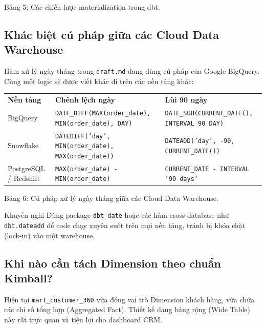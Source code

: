 \documentclass[12pt]{article}
\begin{document}
\begin{captionbelowboxaivn}
Bảng 5: Các chiến lược materialization trong dbt.
\end{captionbelowboxaivn}

\subsection{Khác biệt cú pháp giữa các Cloud Data Warehouse}

Hàm xử lý ngày tháng trong \texttt{draft.md} đang dùng cú pháp của Google BigQuery. Cùng một logic sẽ được viết khác đi trên các nền tảng khác:

\noindent
\begin{longtable}{@{}>{\RaggedRight\arraybackslash}p{2.8cm}>{\RaggedRight\arraybackslash}p{6.3cm}>{\RaggedRight\arraybackslash}p{6.7cm}@{}}
\rowcolor{rowLavender}
\textbf{Nền tảng} & \textbf{Chênh lệch ngày} & \textbf{Lùi 90 ngày} \\
\addlinespace[3pt]
\endhead
BigQuery & \texttt{DATE\_DIFF(MAX(order\_date), MIN(order\_date), DAY)} & \texttt{DATE\_SUB(CURRENT\_DATE(), INTERVAL 90 DAY)} \\
\addlinespace[3pt]
Snowflake & \texttt{DATEDIFF('day', MIN(order\_date), MAX(order\_date))} & \texttt{DATEADD('day', -90, CURRENT\_DATE())} \\
\addlinespace[3pt]
PostgreSQL / Redshift & \texttt{MAX(order\_date) - MIN(order\_date)} & \texttt{CURRENT\_DATE - INTERVAL '90 days'} \\
\end{longtable}

\begin{captionbelowboxaivn}
Bảng 6: Cú pháp xử lý ngày tháng giữa các Cloud Data Warehouse.
\end{captionbelowboxaivn}

\begin{guidelinebox}{Khuyến nghị}
Dùng package \texttt{dbt\_date} hoặc các hàm cross-database như \texttt{dbt.dateadd} để code chạy xuyên suốt trên mọi nền tảng, tránh bị khóa chặt (lock-in) vào một warehouse.
\end{guidelinebox}

\subsection{Khi nào cần tách Dimension theo chuẩn Kimball?}

Hiện tại \texttt{mart\_customer\_360} vừa đóng vai trò Dimension khách hàng, vừa chứa các chỉ số tổng hợp (Aggregated Fact). Thiết kế dạng bảng rộng (Wide Table) này rất trực quan và tiện lợi cho dashboard CRM.
\end{document}
